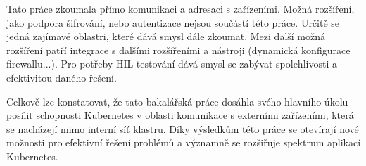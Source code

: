 Tato práce zkoumala přímo komunikaci a adresaci s zařízeními. Možná rozšíření, jako podpora šifrování, nebo autentizace nejsou součástí této práce. Určitě se jedná zajímavé oblastri, které dává smysl dále zkoumat. Mezi další možná rozšíření patří integrace s dalšími rozšířeními a nástroji (dynamická konfigurace firewallu...). Pro potřeby HIL testování dává smysl se zabývat spolehlivosti a efektivitou daného řešení.

Celkově lze konstatovat, že tato bakalářská práce dosáhla svého hlavního úkolu - posílit schopnosti Kubernetes v oblasti komunikace s externími zařízeními, která se nacházejí mimo interní síť klastru. Díky výsledkům této práce se otevírají nové možnosti pro efektivní řešení problémů a významně se rozšiřuje spektrum aplikací Kubernetes.
